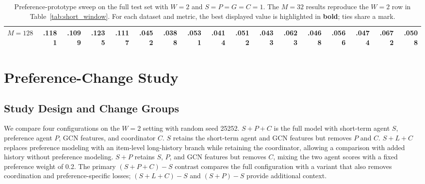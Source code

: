 ﻿\documentclass[sigconf,anonymous,review]{acmart}
\begin{document}
\begin{table}[!tbp]
{\begin{tabular}{l*{4}{rrrr}}
$M=128$ & \textbf{.1181} & \textbf{.1099} & .1235 & .1117 & .0452 & .0388 & .0531 & .0414 & \textbf{.0512} & \textbf{.0433} & \textbf{.0623} & .0468 & .0566 & .0474 & .0672 & .0508 \\
\bottomrule
    \end{tabular}%
    }
    \caption{Preference-prototype sweep on the full test set with $W=2$ and $S=P=G=C=1$. The $M=32$ results reproduce the $W=2$ row in Table~\ref{tab:short_window}. For each dataset and metric, the best displayed value is highlighted in \textbf{bold}; ties share a mark.}
    \label{tab:prefsweep_sw2}
    \vspace{-0.3cm}
\end{table}

\section{Preference-Change Study}
\label{app:preference_change}

\subsection{Study Design and Change Groups}

We compare four configurations on the $W=2$ setting with random seed 25252. $S+P+C$ is the full model with short-term agent $S$, preference agent $P$, GCN features, and coordinator $C$. $S$ retains the short-term agent and GCN features but removes $P$ and $C$. $S+L+C$ replaces preference modeling with an item-level long-history branch while retaining the coordinator, allowing a comparison with added history without preference modeling. $S+P$ retains $S$, $P$, and GCN features but removes $C$, mixing the two agent scores with a fixed preference weight of 0.2. The primary $(S+P+C)-S$ contrast compares the full configuration with a variant that also removes coordination and preference-specific losses; $(S+L+C)-S$ and $(S+P)-S$ provide additional context.
\end{document}
